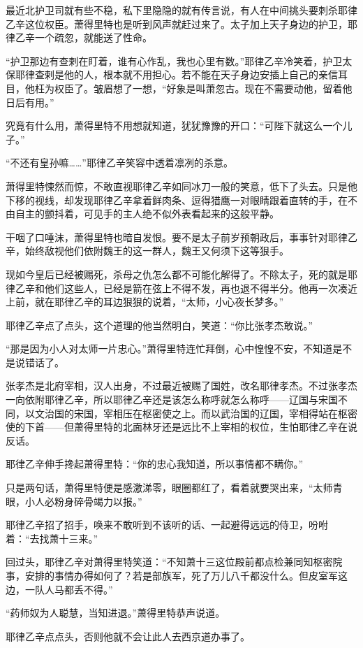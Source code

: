 最近北护卫司就有些不稳，私下里隐隐的就有传言说，有人在中间挑头要刺杀耶律乙辛这位权臣。萧得里特也是听到风声就赶过来了。太子加上天子身边的护卫，耶律乙辛一个疏忽，就能送了性命。

“护卫那边有查剌在盯着，谁有心作乱，我也心里有数。”耶律乙辛冷笑着，护卫太保耶律查剌是他的人，根本就不用担心。若不能在天子身边安插上自己的亲信耳目，他枉为权臣了。皱眉想了一想，“好象是叫萧忽古。现在不需要动他，留着他日后有用。”

究竟有什么用，萧得里特不用想就知道，犹犹豫豫的开口：“可陛下就这么一个儿子。”

“不还有皇孙嘛……”耶律乙辛笑容中透着凛冽的杀意。

萧得里特悚然而惊，不敢直视耶律乙辛如同冰刀一般的笑意，低下了头去。只是他下移的视线，却发现耶律乙辛拿着鲜肉条、逗得猎鹰一对眼睛跟着直转的手，在不由自主的颤抖着，可见手的主人绝不似外表看起来的这般平静。

干咽了口唾沫，萧得里特也暗自发恨。要不是太子前岁预朝政后，事事针对耶律乙辛，始终敌视他们依附魏王的这一群人，魏王又何须下这等狠手。

现如今皇后已经被赐死，杀母之仇怎么都不可能化解得了。不除太子，死的就是耶律乙辛和他们这些人，已经是箭在弦上不得不发，再也退不得半分。他再一次凑近上前，就在耶律乙辛的耳边狠狠的说着，“太师，小心夜长梦多。”

耶律乙辛点了点头，这个道理的他当然明白，笑道：“你比张孝杰敢说。”

“那是因为小人对太师一片忠心。”萧得里特连忙拜倒，心中惶惶不安，不知道是不是说错话了。

张孝杰是北府宰相，汉人出身，不过最近被赐了国姓，改名耶律孝杰。不过张孝杰一向依附耶律乙辛，所以耶律乙辛还是该怎么称呼就怎么称呼——辽国与宋国不同，以文治国的宋国，宰相压在枢密使之上。而以武治国的辽国，宰相得站在枢密使的下首——但萧得里特的北面林牙还是远比不上宰相的权位，生怕耶律乙辛在说反话。

耶律乙辛伸手搀起萧得里特：“你的忠心我知道，所以事情都不瞒你。”

只是两句话，萧得里特便是感激涕零，眼圈都红了，看着就要哭出来，“太师青眼，小人必粉身碎骨竭力以报。”

耶律乙辛招了招手，唤来不敢听到不该听的话、一起避得远远的侍卫，吩咐着：“去找萧十三来。”

回过头，耶律乙辛对萧得里特笑道：“不知萧十三这位殿前都点检兼同知枢密院事，安排的事情办得如何了？若是部族军，死了万儿八千都没什么。但皮室军这边，一队人马都丢不得。”

“药师奴为人聪慧，当知进退。”萧得里特恭声说道。

耶律乙辛点点头，否则他就不会让此人去西京道办事了。

